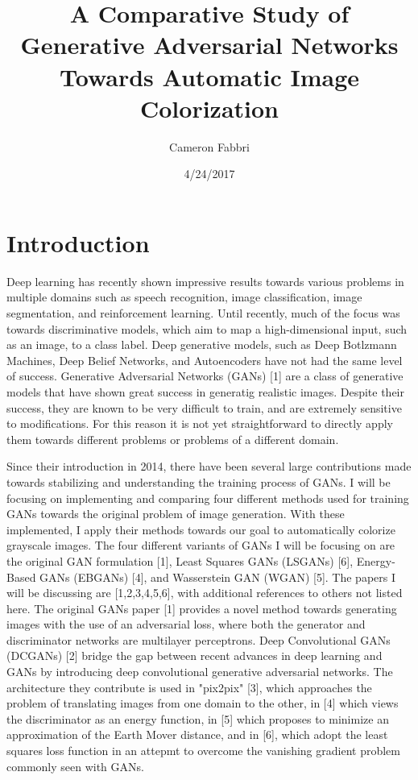 \documentclass[9pt]{article}
\begin{document}
\title{A Comparative Study of Generative Adversarial Networks Towards Automatic Image Colorization}

\author{Cameron Fabbri}
\date{4/24/2017}

\maketitle

\section{Introduction}
Deep learning has recently shown impressive results towards various problems in multiple domains such as speech recognition,
image classification, image segmentation, and reinforcement learning. Until recently, much of the focus was towards
discriminative models, which aim to map a high-dimensional input, such as an image, to a class label. Deep generative models,
such as Deep Botlzmann Machines, Deep Belief Networks, and Autoencoders have not had the same level of success.
Generative Adversarial Networks (GANs) [1] are a class of generative models that have shown great success in generatig realistic
images. Despite their success, they are known to be very difficult to train, and are extremely sensitive to modifications.
For this reason it is not yet straightforward to directly apply them towards different problems or problems of a different domain.\newline

\noindent Since their introduction in 2014, there have been several large contributions made towards stabilizing and understanding
the training process of GANs. I will be focusing on implementing and comparing four different methods used for training GANs towards
the original problem of image generation. With these implemented, I apply their methods towards our goal to automatically
colorize grayscale images. The four different variants of GANs I will be focusing on are the original GAN formulation [1], Least Squares
GANs (LSGANs) [6], Energy-Based GANs (EBGANs) [4], and Wasserstein GAN (WGAN) [5]. The papers I will be discussing are [1,2,3,4,5,6], with additional
references to others not listed here. The original GANs paper [1] provides a novel method towards generating images with the use of an
adversarial loss, where both the generator and discriminator networks are multilayer perceptrons. Deep Convolutional GANs (DCGANs) [2]
bridge the gap between recent advances in deep learning and GANs by introducing deep convolutional generative adversarial networks. The architecture they contribute
is used in "pix2pix" [3], which approaches the problem of translating images from one domain to the other, in [4] which views the discriminator
as an energy function, in [5] which proposes to minimize an approximation of the Earth Mover distance, and in [6], which adopt the
least squares loss function in an attepmt to overcome the vanishing gradient problem commonly seen with GANs.
\end{document}
